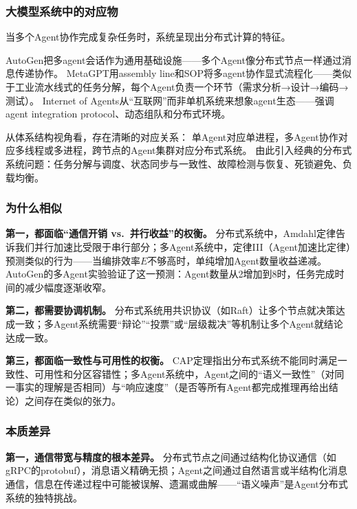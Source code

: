 \subsubsection{大模型系统中的对应物}

当多个Agent协作完成复杂任务时，系统呈现出分布式计算的特征。

AutoGen把多agent会话作为通用基础设施\cite{wu2023autogen}——多个Agent像分布式节点一样通过消息传递协作。
MetaGPT用assembly line和SOP将多agent协作显式流程化\cite{metagpt2023}——类似于工业流水线式的任务分解，每个Agent负责一个环节（需求分析→设计→编码→测试）。
Internet of Agents从``互联网''而非单机系统来想象agent生态\cite{ioa2024}——强调agent integration protocol、动态组队和分布式环境。

从体系结构视角看，存在清晰的对应关系：
单Agent对应单进程，多Agent协作对应多线程或多进程，跨节点的Agent集群对应分布式系统。
由此引入经典的分布式系统问题：任务分解与调度、状态同步与一致性、故障检测与恢复、死锁避免、负载均衡。

\subsubsection{为什么相似}

\textbf{第一，都面临``通信开销 vs.\ 并行收益''的权衡。}
分布式系统中，Amdahl定律告诉我们并行加速比受限于串行部分；多Agent系统中，定律III（Agent加速比定律）预测类似的行为——当编排效率$E$不够高时，单纯增加Agent数量收益递减。
AutoGen的多Agent实验验证了这一预测：Agent数量从2增加到8时，任务完成时间的减少幅度逐渐收窄\cite{wu2023autogen}。

\textbf{第二，都需要协调机制。}
分布式系统用共识协议（如Raft\cite{raft2014}）让多个节点就决策达成一致；多Agent系统需要``辩论''``投票''或``层级裁决''等机制让多个Agent就结论达成一致。

\textbf{第三，都面临一致性与可用性的权衡。}
CAP定理指出分布式系统不能同时满足一致性、可用性和分区容错性\cite{cap2002}；多Agent系统中，Agent之间的``语义一致性''（对同一事实的理解是否相同）与``响应速度''（是否等所有Agent都完成推理再给出结论）之间存在类似的张力。

\subsubsection{本质差异}

\textbf{第一，通信带宽与精度的根本差异。}
分布式节点之间通过结构化协议通信（如gRPC的protobuf），消息语义精确无损；Agent之间通过自然语言或半结构化消息通信，信息在传递过程中可能被误解、遗漏或曲解——``语义噪声''是Agent分布式系统的独特挑战。


